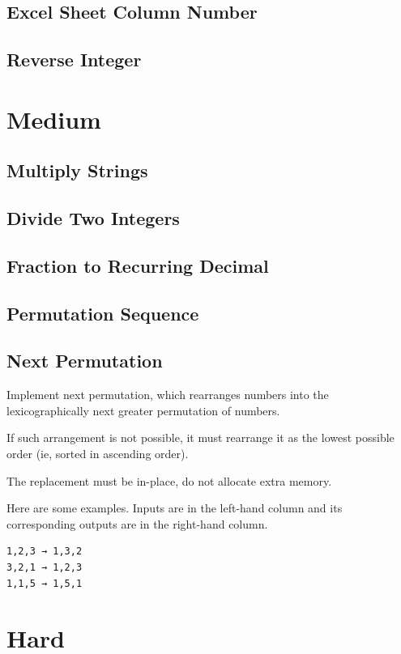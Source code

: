 \documentclass[12pt]{book}
\begin{document}
\subsection{Excel Sheet Column Number}
\label{sec-21-1-6}
\subsection{Reverse Integer}
\label{sec-21-1-7}
\section{Medium}
\label{sec-21-2}
\subsection{Multiply Strings}
\label{sec-21-2-1}
\subsection{Divide Two Integers}
\label{sec-21-2-2}
\subsection{Fraction to Recurring Decimal}
\label{sec-21-2-3}
\subsection{Permutation Sequence}
\label{sec-21-2-4}
\subsection{Next Permutation}
\label{sec-21-2-5}
Implement next permutation, which rearranges numbers into the lexicographically next greater permutation of numbers.

If such arrangement is not possible, it must rearrange it as the lowest possible order (ie, sorted in ascending order).

The replacement must be in-place, do not allocate extra memory.

Here are some examples. Inputs are in the left-hand column and its
corresponding outputs are in the right-hand column.
\lstset{language=java,label= ,caption= ,numbers=none}
\begin{lstlisting}
1,2,3 → 1,3,2
3,2,1 → 1,2,3
1,1,5 → 1,5,1
\end{lstlisting}
\section{Hard}
\label{sec-21-3}
\end{document}
